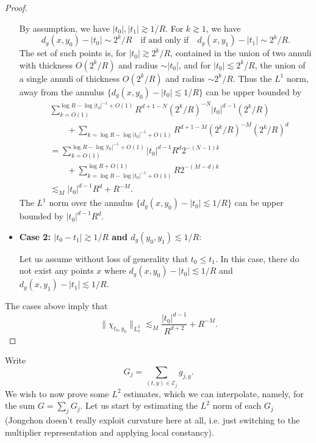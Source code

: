 \begin{proof}
\begin{itemize}
        By assumption, we have $|t_0|, |t_1| \gtrsim 1/R$. For $k \gtrsim 1$, we have
        \[ d_g(x,y_0) - |t_0| \sim 2^k / R \quad \text{if and only if} \quad d_g(x,y_1) - |t_1| \sim 2^k / R. \]
        The set of such points is, for $|t_0| \gtrsim 2^k / R$, contained in the union of two annuli with thickness $O(2^k / R)$ and radius $\sim |t_0|$, and for $|t_0| \lesssim 2^k / R$, the union of a single annuli of thickness $O(2^k / R)$ and radius $\sim 2^k / R$. Thus the $L^1$ norm, away from the annulus $\{ d_g(x,y_0) - |t_0| \lesssim 1/R \}$ can be upper bounded by
        \begin{align*}
            &\sum_{k = O(1)}^{\log R - \log |t_0|^{-1} + O(1)} R^{d+1-N} (2^k / R)^{-N} |t_0|^{d-1} (2^k / R)\\
            &\quad \quad + \sum_{k = \log R - \log |t_0|^{-1} + O(1)} R^{d+1-M} (2^k / R)^{-M} (2^k / R)^d\\
            & = \sum_{k = O(1)}^{\log R - \log |t_0|^{-1} + O(1)} |t_0|^{d-1} R^d 2^{-(N-1)k}\\
            &\quad \quad + \sum_{k = \log R - \log |t_0|^{-1} + O(1)}^{\log R + O(1)} R 2^{-(M-d)k}\\
            & \lesssim_M |t_0|^{d-1} R^d + R^{-M}.
        \end{align*}
        The $L^1$ norm over the annulus $\{ d_g(x,y_0) - |t_0| \lesssim 1/R \}$ can be upper bounded by $|t_0|^{d-1} R^d$.

        \item {\bf Case 2: $|t_0 - t_1| \gtrsim 1/R$ and $d_g(y_0,y_1) \lesssim 1/R$}:

        Let us assume without loss of generality that $t_0 \leq t_1$. In this case, there do not exist any points $x$ where $d_g(x,y_0) - |t_0| \lesssim 1/R$ and $d_g(x,y_1) - |t_1| \lesssim 1/R$. 
    \end{itemize}
    The cases above imply that
    \[ \| \chi_{t_0,y_0} \|_{L^2_x} \lesssim_M \frac{|t_0|^{d-1}}{R^{d + 2}} + R^{-M}. \]
\end{proof}

Write
%
\[ G_j = \sum_{(t,y) \in \mathcal{E}_j} g_{j,y}. \]
%
We wish to now prove some $L^2$ estimates, which we can interpolate, namely, for the sum $G = \sum_j G_j$. Let us start by estimating the $L^2$ norm of each $G_j$ (Jongchon doesn't really exploit curvature here at all, i.e. just switching to the multiplier representation and applying local constancy).





